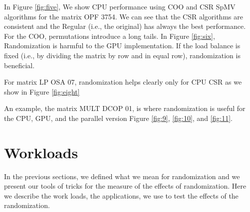 \documentclass[manuscript,screen]{acmart}
\begin{document}
In Figure \ref{fig:five}, We show CPU performance
using COO and CSR SpMV algorithms for the matrix OPF 3754. We can see
that the CSR algorithms are consistent and the Regular (i.e., the
original) has always the best performance. For the COO, permutations
introduce a long tails. In Figure \ref{fig:six}, Randomization is
harmful to the GPU implementation. If the load balance is fixed (i.e.,
by dividing the matrix by row and in equal row), randomization is
beneficial.




For matrix LP OSA 07, randomization helps clearly only for CPU CSR as
we show in Figure \ref{fig:eight}


An example, the matrix MULT DCOP 01, is where randomization is useful
for the CPU, GPU, and the parallel version Figure \ref{fig:9},
\ref{fig:10}, and \ref{fig:11}. 





\section{Workloads}
\label{sec:workload}

In the previous sections, we defined what we mean for randomization
and we present our tools of tricks for the measure of the effects of
randomization. Here we describe the work loads, the applications, we
use to test the effects of the randomization.
\end{document}
